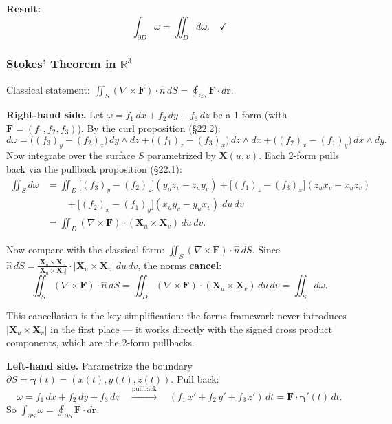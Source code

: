 \documentclass[11pt]{report}
\newcommand{\R}{\mathbb{R}}
\begin{document}
\textbf{Result:}
\[
\int_{\partial D} \omega = \iint_D d\omega. \quad \checkmark
\]

\subsubsection*{Stokes' Theorem in $\R^3$}

Classical statement: $\iint_S (\nabla \times \mathbf{F}) \cdot \hat{n}\,dS = \oint_{\partial S} \mathbf{F} \cdot d\mathbf{r}$.

\textbf{Right-hand side.} Let $\omega = f_1\,dx + f_2\,dy + f_3\,dz$ be a 1-form (with $\mathbf{F} = (f_1, f_2, f_3)$). By the curl proposition (\S22.2):
\[
d\omega = \big((f_3)_y - (f_2)_z\big)\,dy \wedge dz + \big((f_1)_z - (f_3)_x\big)\,dz \wedge dx + \big((f_2)_x - (f_1)_y\big)\,dx \wedge dy.
\]
Now integrate over the surface $S$ parametrized by $\mathbf{X}(u,v)$. Each 2-form pulls back via the pullback proposition (\S22.1):
\begin{align*}
\iint_S d\omega &= \iint_D \big[(f_3)_y - (f_2)_z\big](y_u z_v - z_u y_v) + \big[(f_1)_z - (f_3)_x\big](z_u x_v - x_u z_v) \\
&\qquad + \big[(f_2)_x - (f_1)_y\big](x_u y_v - y_u x_v) \; du\,dv \\
&= \iint_D (\nabla \times \mathbf{F}) \cdot (\mathbf{X}_u \times \mathbf{X}_v)\,du\,dv.
\end{align*}

Now compare with the classical form: $\iint_S (\nabla \times \mathbf{F}) \cdot \hat{n}\,dS$. Since $\hat{n}\,dS = \frac{\mathbf{X}_u \times \mathbf{X}_v}{|\mathbf{X}_u \times \mathbf{X}_v|} \cdot |\mathbf{X}_u \times \mathbf{X}_v|\,du\,dv$, the norms \textbf{cancel}:
\[
\iint_S (\nabla \times \mathbf{F}) \cdot \hat{n}\,dS = \iint_D (\nabla \times \mathbf{F}) \cdot (\mathbf{X}_u \times \mathbf{X}_v)\,du\,dv = \iint_S d\omega.
\]

This cancellation is the key simplification: the forms framework never introduces $|\mathbf{X}_u \times \mathbf{X}_v|$ in the first place --- it works directly with the signed cross product components, which are the 2-form pullbacks.

\textbf{Left-hand side.} Parametrize the boundary $\partial S = \boldsymbol{\gamma}(t) = (x(t), y(t), z(t))$. Pull back:
\[
\omega = f_1\,dx + f_2\,dy + f_3\,dz \quad \xrightarrow{\text{pullback}} \quad (f_1\,x' + f_2\,y' + f_3\,z')\,dt = \mathbf{F} \cdot \boldsymbol{\gamma}'(t)\,dt.
\]
So $\int_{\partial S} \omega = \oint_{\partial S} \mathbf{F} \cdot d\mathbf{r}$.
\end{document}
